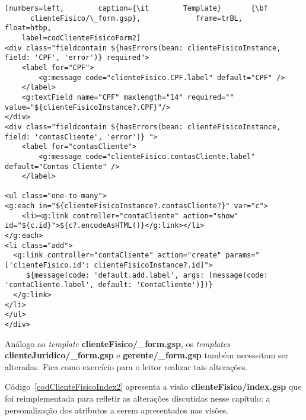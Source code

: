 \begin{lstlisting}[numbers=left,        caption={\it        Template}       {\bf
      clienteFisico/\_form.gsp},             frame=trBL,             float=htbp,
    label=codClienteFisicoForm2]
<div class="fieldcontain ${hasErrors(bean: clienteFisicoInstance, field: 'CPF', 'error')} required">
	<label for="CPF">
		<g:message code="clienteFisico.CPF.label" default="CPF" />
	</label>
	<g:textField name="CPF" maxlength="14" required="" value="${clienteFisicoInstance?.CPF}"/>
</div>
<div class="fieldcontain ${hasErrors(bean: clienteFisicoInstance, field: 'contasCliente', 'error')} ">
	<label for="contasCliente">
		<g:message code="clienteFisico.contasCliente.label" default="Contas Cliente" />		
	</label>
	
<ul class="one-to-many">
<g:each in="${clienteFisicoInstance?.contasCliente?}" var="c">
    <li><g:link controller="contaCliente" action="show" id="${c.id}">${c?.encodeAsHTML()}</g:link></li>
</g:each>
<li class="add">
  <g:link controller="contaCliente" action="create" params="['clienteFisico.id': clienteFisicoInstance?.id]">
     ${message(code: 'default.add.label', args: [message(code: 'contaCliente.label', default: 'ContaCliente')])}
  </g:link>
</li>
</ul>
</div>
\end{lstlisting}

\vspace{0.3cm}

\begin{remark}
Análogo  ao {\it  template} {\bf  clienteFisico/\_form.gsp}, os  {\it templates}
{\bf  clienteJuridico/\_form.gsp} e  {\bf gerente/\_form.gsp}  também necessitam
ser alteradas.  Fica como exercício para o leitor realizar tais alterações.  
\end{remark}

\newpage

\noindent    Código~\ref{codClienteFisicoIndex2}   apresenta   a    visão   {\bf
  clienteFisico/index.gsp}  que foi reimplementada  para refletir  as alterações
discutidas nesse  capítulo: a personalização dos atributos  a serem apresentados
nas visões. 

\vspace{0.5cm}

